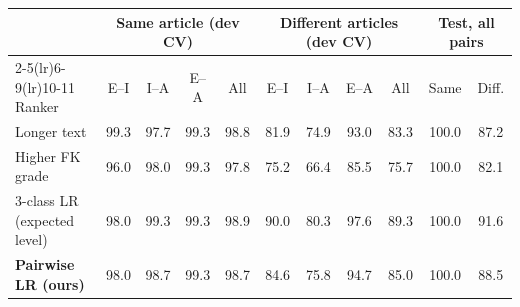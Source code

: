 \begin{tabular}{lcccccccccc}
\toprule
 & \multicolumn{4}{c}{Same article (dev CV)} & \multicolumn{4}{c}{Different articles (dev CV)} & \multicolumn{2}{c}{Test, all pairs} \\
\cmidrule(lr){2-5}\cmidrule(lr){6-9}\cmidrule(lr){10-11}
Ranker & E--I & I--A & E--A & All & E--I & I--A & E--A & All & Same & Diff. \\
\midrule
Longer text & 99.3 & 97.7 & 99.3 & 98.8 & 81.9 & 74.9 & 93.0 & 83.3 & 100.0 & 87.2 \\
Higher FK grade & 96.0 & 98.0 & 99.3 & 97.8 & 75.2 & 66.4 & 85.5 & 75.7 & 100.0 & 82.1 \\
3-class LR (expected level) & 98.0 & 99.3 & 99.3 & 98.9 & 90.0 & 80.3 & 97.6 & 89.3 & 100.0 & 91.6 \\
\textbf{Pairwise LR (ours)} & 98.0 & 98.7 & 99.3 & 98.7 & 84.6 & 75.8 & 94.7 & 85.0 & 100.0 & 88.5 \\
\bottomrule
\end{tabular}
